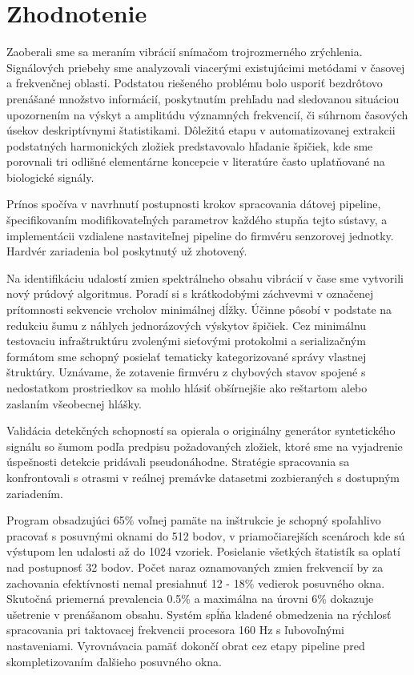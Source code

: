 \chapter{Zhodnotenie} \label{chapter:evaluation}
Zaoberali sme sa meraním vibrácií snímačom trojrozmerného zrýchlenia.
Signálových priebehy sme analyzovali viacerými existujúcimi metódami v časovej a frekvenčnej oblasti.
Podstatou riešeného problému bolo usporiť bezdrôtovo prenášané množstvo informácií, poskytnutím
prehľadu nad sledovanou situáciou upozornením na výskyt a amplitúdu významných frekvencií, či súhrnom
časových úsekov deskriptívnymi štatistikami. Dôležitú etapu v automatizovanej extrakcii
podstatných harmonických zložiek predstavovalo hľadanie špičiek, kde sme porovnali tri odlišné
elementárne koncepcie v literatúre často uplatňované na biologické signály.

Prínos spočíva v navrhnutí postupnosti krokov spracovania dátovej pipeline, špecifikovaním
modifikovateľných parametrov každého stupňa tejto sústavy, a implementácii vzdialene nastaviteľnej
pipeline do firmvéru senzorovej jednotky. Hardvér zariadenia bol poskytnutý už zhotovený.

Na identifikáciu udalostí zmien spektrálneho obsahu vibrácií v čase sme vytvorili nový prúdový algoritmus.
Poradí si s krátkodobými záchvevmi v označenej prítomnosti sekvencie vrcholov minimálnej dĺžky. Účinne pôsobí
v podstate na redukciu šumu z náhlych jednorázových výskytov špičiek. Cez minimálnu testovaciu infraštruktúru
zvolenými sieťovými protokolmi a serializačným formátom sme schopný posielať tematicky kategorizované správy vlastnej
štruktúry. Uznávame, že zotavenie firmvéru z chybových stavov spojené s nedostatkom prostriedkov sa mohlo
hlásiť obšírnejšie ako reštartom alebo zaslaním všeobecnej hlášky.

Validácia detekčných schopností sa opierala o originálny generátor syntetického signálu so šumom podľa
predpisu požadovaných zložiek, ktoré sme na vyjadrenie úspešnosti detekcie pridávali pseudonáhodne.
Stratégie spracovania sa konfrontovali s otrasmi v reálnej premávke datasetmi
zozbieraných s dostupným zariadením.

Program obsadzujúci 65\% voľnej pamäte na inštrukcie je schopný spoľahlivo pracovať s posuvnými
oknami do 512 bodov, v priamočiarejších scenároch kde sú výstupom len udalosti až do 1024 vzoriek.
Posielanie všetkých štatistík sa oplatí nad postupnosť 32 bodov. Počet naraz oznamovaných
zmien frekvencií by za zachovania efektívnosti nemal presiahnuť 12 - 18\% vedierok posuvného
okna. Skutočná priemerná prevalencia 0.5\% a maximálna na úrovni 6\% dokazuje ušetrenie v prenášanom obsahu.
Systém spĺňa kladené obmedzenia na rýchlosť spracovania pri taktovacej frekvencii procesora 160 Hz s ľubovoľnými
nastaveniami. Vyrovnávacia pamäť dokončí obrat cez etapy pipeline pred skompletizovaním ďalšieho posuvného okna.

